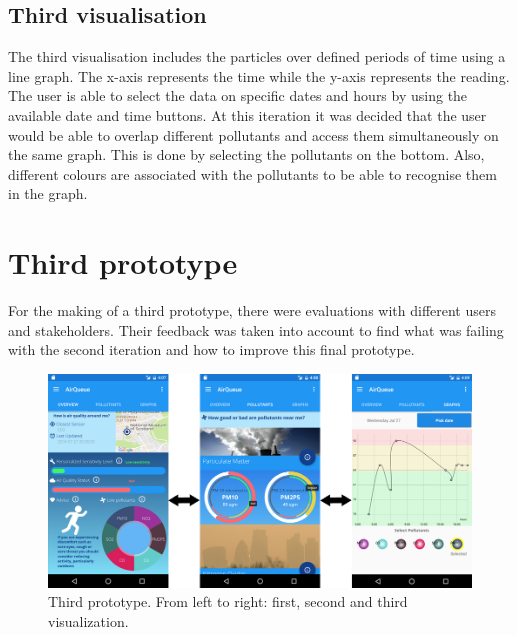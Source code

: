 \subsection{Third visualisation}
The third visualisation includes the particles over defined periods of time using a line graph. The x-axis represents the time while the y-axis represents the reading. The user is able to select the data on specific dates and hours by using the available date and time buttons. At this iteration it was decided that the user would be able to overlap different pollutants and access them simultaneously on the same graph. This is done by selecting the pollutants on the bottom. Also, different colours are associated with the pollutants to be able to recognise them in the graph.

\section{Third prototype}
For the making of a third prototype, there were evaluations with different users and stakeholders. Their feedback was taken into account to find what was failing with the second iteration and how to improve this final prototype. 

\begin{figure}[H]
\begin{adjustbox}{width=1.2\textwidth,center=\textwidth}
  \centering
  \includegraphics[scale=1]{images/thirdPrototype.png}
\end{adjustbox}
  \caption[Third prototype]{Third prototype. From left to right: first, second and third visualization.}
  \label{fig:third_prototype}
\end{figure}

